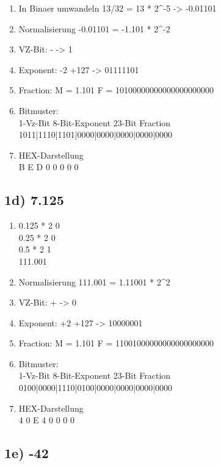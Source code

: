 \documentclass[]{article}
\providecommand{\tightlist}{%
  \setlength{\itemsep}{0pt}\setlength{\parskip}{0pt}}
\begin{document}
\begin{enumerate}
\tightlist
\item
  In Binaer umwandeln 13/32 = 13 * 2\^{}-5 -> -0.01101
\item
  Normalisierung -0.01101 = -1.101 * 2\^{}-2
\item
  VZ-Bit: - -> 1
\item
  Exponent: -2 +127 -> 01111101
\item
  Fraction: M = 1.101 F = 10100000000000000000000
\item
  Bitmuster:\\
  1-Vz-Bit 8-Bit-Exponent 23-Bit Fraction\\
  1011|1110|1101|0000|0000|0000|0000|0000
\item
  HEX-Darstellung\\
  B E D 0 0 0 0 0
\end{enumerate}

\subsection{1d) 7.125}\label{d-7.125}

\begin{enumerate}
\tightlist
\item
  0.125 * 2 0\\
  0.25 * 2 0\\
  0.5 * 2 1\\
  111.001
\item
  Normalisierung 111.001 = 1.11001 * 2\^{}2
\item
  VZ-Bit: + -> 0
\item
  Exponent: +2 +127 -> 10000001
\item
  Fraction: M = 1.101 F = 11001000000000000000000
\item
  Bitmuster:\\
  1-Vz-Bit 8-Bit-Exponent 23-Bit Fraction\\
  0100|0000|1110|0100|0000|0000|0000|0000
\item
  HEX-Darstellung\\
  4 0 E 4 0 0 0 0
\end{enumerate}

\subsection{1e) -42}\label{e--42}
\end{document}
